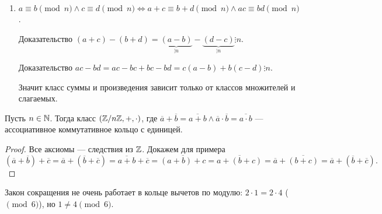 \begin{enumerate}
     \item $a \equiv b \pmod{n} \land c \equiv d \pmod{n} \iff a+c \equiv b+d \pmod{n} \land ac \equiv bd \pmod{n}$. 

         Доказательство  $(a+c) - (b+d) = \underbrace{(a-b)}_{\vdots n} - \underbrace{(d-c)}_{\vdots n} \vdots n$. 

         Доказательство $ac - bd = ac - bc + bc - bd = c (a-b) + b(c-d) \vdots n$.

         Значит класс суммы и произведения зависит только от классов множителей и слагаемых.
\end{enumerate}
\begin{theorem}
    Пусть $n \in \mathbb{N}$. Тогда класс $(\mathbb{Z} / n\mathbb{Z}, +, \cdot)$, где $\overline{a}+\overline{b} = \overline{a+b} \land \overline{a} \cdot \overline{b} = \overline{a \cdot b}$ --- ассоциативное коммутативное кольцо с единицей.
\end{theorem}
\begin{proof}
    Все аксиомы --- следствия из $\mathbb{Z}$. Докажем для примера  $(\overline{a} + \overline{b}) + \overline{c} = \overline{a} + (\overline{b} + \overline{c}) = \overline{a+b} + \overline{c} = \overline{(a+b)+c} = \overline{a + (b+c)} = \overline{a} + \overline{(b+c)} = \overline{a} + (\overline{b} + \overline{c}).$
\end{proof}
\slashn
Закон сокращения не очень работает в кольце вычетов по модулю: $2 \cdot 1 = 2 \cdot 4$ ($\pmod 6$), но  $1 \neq 4 \pmod 6$.

